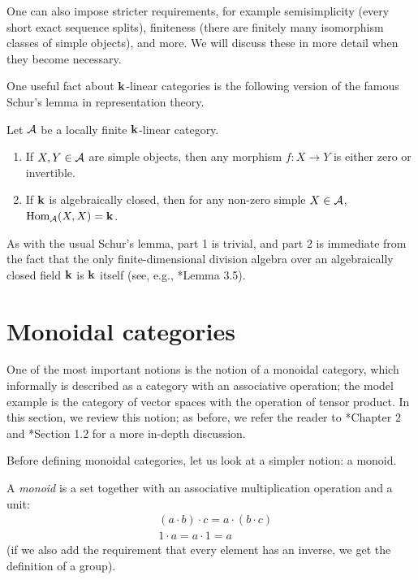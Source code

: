One can also impose stricter requirements, for example semisimplicity (every
short exact sequence splits), finiteness (there are finitely many isomorphism
classes of simple objects), and more. We will discuss these in more detail when
they become necessary.

One useful fact about $\mathbf{k}$-linear categories is the following version of the
famous Schur's lemma in representation theory.

\begin{lemma}\label{l:schur}
  Let $\mathcal{A}$ be a locally finite $\mathbf{k}$-linear category.
  \begin{enumerate}
    \item If $X,Y\in \mathcal{A}$ are simple objects, then any morphism
      $f\colon X\to Y$ is either zero or invertible.
    \item If $\mathbf{k}$ is algebraically closed, then for any non-zero
      simple $X\in \mathcal{A}$, $\operatorname{Hom}_{\mathcal{A}}(X,X)=\mathbf{k}$.
  \end{enumerate}
\end{lemma}
As with the usual Schur's lemma, part 1 is trivial, and part 2 is immediate
from the fact that the only finite-dimensional division algebra over an
algebraically closed field $\mathbf{k}$ is $\mathbf{k}$ itself (see, e.g.,
*{Lemma 3.5}).

\section{Monoidal categories}\label{s:monoidal}
One of the most important notions is the notion of a monoidal category, which
informally is described as a category with an associative operation; the model
example is the category of vector spaces with the operation of tensor product.
In this section, we review this notion; as before, we refer the reader to
*{Chapter 2} and *{Section 1.2} for a more
in-depth discussion.

Before defining monoidal categories, let us look at a simpler notion: a monoid.

A \emph{monoid} is a set together with an associative
multiplication operation and a unit:
\begin{align*}
  &(a\cdot b)\cdot c = a\cdot (b\cdot c)\\
  &1\cdot a = a\cdot 1 = a
\end{align*}
(if we also add the requirement that every element has an inverse,
we get the definition of a group).

